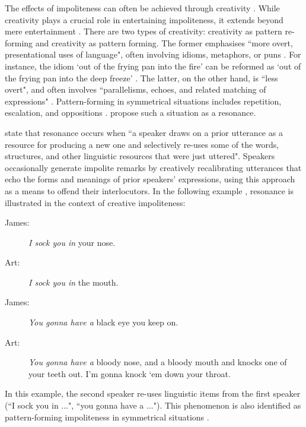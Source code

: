 \documentclass[english]{textolivre}
\begin{document}
The effects of impoliteness can often be achieved through creativity \cite{culpeper2013}. While creativity plays a crucial role in entertaining impoliteness, it extends beyond mere entertainment \cite{culpeper2011}. There are two types of creativity: creativity as pattern re-forming and creativity as pattern forming. The former emphasises ``more overt, presentational uses of language", often involving idioms, metaphors, or puns \cite[p. 109]{carter2004}. For instance, the idiom ‘out of the frying pan into the fire’ can be reformed as ‘out of the frying pan into the deep freeze’ \cite[p. 95]{carter2004}. The latter, on the other hand, is ``less overt", and often involves ``parallelisms, echoes, and related matching of expressions" \cite[p. 109]{carter2004}. Pattern-forming in symmetrical situations includes repetition, escalation, and oppositions \cite{culpeper2011}. \textcite{tantucci2018} propose such a situation as a resonance. 

\textcite[p. 2461]{tantucci-wang2023} state that resonance occurs when ``a speaker draws on a prior utterance as a resource for producing a new one and selectively re-uses some of the words, structures, and other linguistic resources that were just uttered". Speakers occasionally generate impolite remarks by creatively recalibrating utterances that echo the forms and meanings of prior speakers’ expressions, using this approach as a means to offend their interlocutors. In the following example \cite[p. 301]{lein1978}, resonance is illustrated in the context of creative impoliteness:
\begin{description}
\item[James:] \emph{I sock you in} your nose.
\item[Art:] \emph{I sock you in} the mouth.
\item[James:] \emph{You gonna have a} black eye you keep on.
\item[Art:] \emph{You gonna have a} bloody nose, and a bloody mouth and knocks one of your teeth out. I’m gonna knock ‘em down your throat.
\end{description}

In this example, the second speaker re-uses linguistic items from the first speaker (``I sock you in ...", ``you gonna have a ..."). This phenomenon is also identified as pattern-forming impoliteness in symmetrical situations \cite[p. 243]{culpeper2011}.
\end{document}

